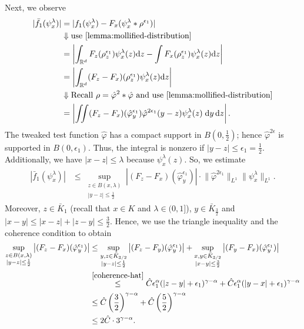 Next, we observe
\begin{align*}
    |\bar f_1(\psi_x^\lambda)| &= |f_1(\psi_x^\lambda) - F_x(\psi_x^\lambda* \rho^{\epsilon_1})| \\
    &\Downarrow \text{use~\eqref{lemma:mollified-distribution}} \\
    &= \left | \int_{\mathbb{R}^d} F_z(\rho_z^{\epsilon_1}) \psi^\lambda_x(z)  \mathrm{d}z -  \int F_x(\rho_z^{\epsilon_1}) \psi^\lambda_x(z) \mathrm{d} z \right| \\
    &= \left | \int_{\mathbb{R}^d} (F_z - F_x)(\rho_z^{\epsilon_1}) \psi^\lambda_x(z)  \mathrm{d}z\right| \\
    &\Downarrow  \text{Recall \(\rho = \hat \varphi^2 * \hat \varphi\) and use~\eqref{lemma:mollified-distribution}} \\
    &= \left| \iint (F_z - F_x)(\hat \varphi^{\epsilon_1}_y) \hat \varphi^{2\epsilon_1}(y-z)\psi^\lambda_x(z) \; \mathrm{d}y \, \mathrm{d}z \right|.
\end{align*}
The tweaked test function \(\hat \varphi\) has a compact support in \(B(0, \frac{1}{2})\); hence \(\hat \varphi^{2\epsilon}\) is supported in \(B(0, \epsilon_1)\). Thus, the integral is nonzero if \(|y-z| \leq \epsilon_1 = \frac{1}{2}\). Additionally, we have \(|x-z|\leq \lambda\) because \(\psi^\lambda_x(z)\). So, we estimate
\begin{align*}
    |\bar f_1(\psi_x^\lambda)| &\leq  \sup_{\substack{z \in B(x, \lambda) \\ |y-z| \leq \frac{1}{2}}} \left| (F_z - F_x)(\hat \varphi^{\epsilon_1}_y) \right|  \cdot \lVert \hat \varphi^{2\epsilon_1} \rVert_{L^1} \lVert  \psi^{\lambda}_x \rVert_{L^1}.
\end{align*}
Moreover, \(z \in \bar K_1\) (recall that \(x \in K\) and \(\lambda \in (0,1]\)), \(y \in \bar K_{\frac{3}{2}}\) and \(|x-y| \leq |x-z| + |z-y| \leq \frac{3}{2}\). Hence, we use the triangle inequality and the coherence condition to obtain 
\begin{align*}
    \sup_{\substack{z \in B(x, \lambda) \\ |y-z| \leq
     \frac{1}{2}}} \left| (F_z - F_x)(\hat \varphi^{\epsilon_1}_y) \right| 
     &\leq \sup_{\substack{y, z \in \bar K_{3/2} \\ |y-z| \leq \frac{1}{2}}} \left| (F_z - F_y)(\hat \varphi^{\epsilon_1}_y) \right| + \sup_{\substack{x,y \in \bar K_{3/2} \\ |x-y| \leq \frac{3}{2}}} \left| (F_y - F_x)(\hat \varphi^{\epsilon_1}_y) \right| \\
     &\overset{\eqref{coherence-hat}}{\leq} \hat C \epsilon_1^\alpha(|z-y| + \epsilon_1)^{\gamma - \alpha} + \hat C \epsilon_1^\alpha(|y-x| + \epsilon_1)^{\gamma - \alpha}\\
     &\leq \hat C \left(\frac{3}{2}\right)^{\gamma - \alpha } + \hat C \left(\frac{5}{2}\right)^{\gamma - \alpha } \\
     &\leq 2\hat C \cdot  3^{\gamma - \alpha}.
\end{align*}
